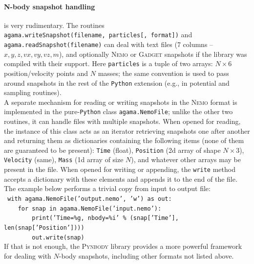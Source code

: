 \documentclass[12pt]{article}
\newcommand{\Nemo} {\textsc{Nemo}\xspace}
\newcommand{\Python}{\texttt{Python}\xspace}
\newcommand{\ppp}[1]{\textcolor{darkolive} {\texttt{#1}}}
\let\oldparagraph\paragraph
\renewcommand{\paragraph}[1]{\vspace{-2mm}\oldparagraph{#1}}
\begin{document}
\paragraph{N-body snapshot handling} \label{sec:PythonSnapshot} is very rudimentary. The routines\\
\texttt{agama.writeSnapshot(filename, particles[, format])} and\\ \texttt{agama.readSnapshot(filename)} can deal with text files (7 columns -- $x,y,z,vx,vy,vz,m$), and optionally \Nemo or \textsc{Gadget} snapshots if the library was compiled with their support. Here \ppp{particles} is a tuple of two arrays: $N\times6$ position/velocity points and $N$ masses; the same convention is used to pass around snapshots in the rest of the \Python extension (e.g., in potential and sampling routines).\\
A separate mechanism for reading or writing snapshots in the \Nemo format is implemented in the pure-\Python class \texttt{agama.NemoFile}; unlike the other two routines, it can handle files with multiple snapshots. When opened for reading, the instance of this class acts as an iterator retrieving snapshots one after another and returning them as dictionaries containing the following items (none of them are guaranteed to be present): \texttt{Time} (float), \texttt{Position} (2d array of shape $N\times3$), \texttt{Velocity} (same), \texttt{Mass} (1d array of size $N$), and whatever other arrays may be present in the file. When opened for writing or appending, the \texttt{write} method accepts a dictionary with these elements and appends it to the end of the file. The example below performs a trivial copy from input to output file:\\[1mm]
\texttt{
with agama.NemoFile('output.nemo', 'w') as out:\\
\mbox{}~~~~for snap in agama.NemoFile('input.nemo'):\\
\mbox{}~~~~~~~~print('Time=\%g, nbody=\%i' \% (snap['Time'], len(snap['Position'])))\\
\mbox{}~~~~~~~~out.write(snap)}\\[2mm]
If that is not enough, the \textsc{Pynbody} library \cite{Pynbody} provides a more powerful framework for dealing with $N$-body snapshots, including other formats not listed above.
\end{document}
